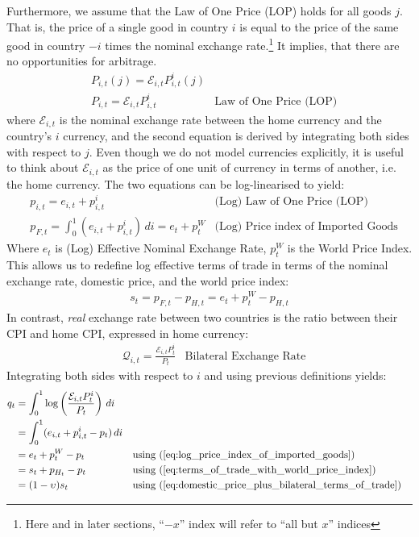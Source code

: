 Furthermore, we assume that the Law of One Price (LOP) holds for all goods $j$. That is, the price of a single good in country $i$ is equal to the price of the same good in country $-i$ times the nominal exchange rate.\footnote{Here and in later sections, ``$-x$'' index will refer to ``all but $x$'' indices} It implies, that there are no opportunities for arbitrage.
\begin{align}
 &P_{i,t}(j) = \mathcal{E}_{i,t}P_{i,t}^i(j) & \nonumber \\
 &P_{i,t} = \mathcal{E}_{i,t}P_{i,t}^i & \text{Law of One Price (LOP)} 
\end{align}
where $\mathcal{E}_{i,t}$ is the nominal exchange rate between the home currency and the country's $i$ currency, and the second equation is derived by integrating both sides with respect to $j$. Even though we do not model currencies explicitly, it is useful to think about $\mathcal{E}_{i,t}$ as the price of one unit of currency in terms of another, i.e. the home currency. The two equations can be log-linearised to yield:
\begin{align}
 &p_{i,t} = e_{i,t}+p_{i,t}^i & \text{(Log) Law of One Price (LOP)} \\
 &p_{F,t} = \int_{0}^{1}(e_{i,t}+p_{i,t}^i) \,di = e_t + p_t^{W} \label{eq:log_price_index_of_imported_goods} & \text{(Log) Price index of Imported Goods}
\end{align}
Where $e_t$ is (Log) Effective Nominal Exchange Rate, $p_t^{W}$ is the World Price Index. This allows us to redefine log effective terms of trade in terms of the nominal exchange rate, domestic price, and the world price index:
\begin{align}
 s_t = p_{F,t} - p_{H,t} = e_t + p_t^{W} - p_{H,t} \label{eq:terms_of_trade_with_world_price_index}
\end{align}
In contrast, \textit{real} exchange rate between two countries is the ratio between their CPI and home CPI, expressed in home currency:
\begin{align}
 &\mathcal{Q}_{i,t} = \frac{\mathcal{E}_{i,t}P_{t}^i}{P_t} & \text{Bilateral Exchange Rate} 
\end{align}
Integrating both sides with respect to $i$ and using previous definitions yields:
\begin{align}
 q_t & = \int_{0}^{1} \log \left( \frac{\mathcal{E}_{i,t}P_{t}^i}{P_t} \right) \, di \\
 & = \int_{0}^{1} (e_{i,t} + p_{i,t}^i - p_t) \, di & & \\
 & = e_t + p_t^{W} - p_t & & \text{using (\ref{eq:log_price_index_of_imported_goods})} \\
 & = s_t + p_{H_t} - p_t & & \text{using (\ref{eq:terms_of_trade_with_world_price_index})} \\
 & = (1-\upsilon)s_t & & \text{using (\ref{eq:domestic_price_plus_bilateral_terms_of_trade})}
\end{align}
